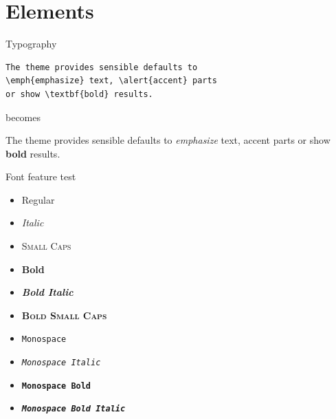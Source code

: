 \section{Elements}

\begin{frame}[fragile]{Typography}
            \begin{verbatim}The theme provides sensible defaults to
\emph{emphasize} text, \alert{accent} parts
or show \textbf{bold} results.\end{verbatim}

    \begin{center}becomes\end{center}

    The theme provides sensible defaults to \emph{emphasize} text,
    \alert{accent} parts or show \textbf{bold} results.
\end{frame}

\begin{frame}{Font feature test}
    \begin{itemize}
        \item Regular
        \item \textit{Italic}
        \item \textsc{Small Caps}
        \item \textbf{Bold}
        \item \textbf{\textit{Bold Italic}}
        \item \textbf{\textsc{Bold Small Caps}}
        \item \texttt{Monospace}
        \item \texttt{\textit{Monospace Italic}}
        \item \texttt{\textbf{Monospace Bold}}
        \item \texttt{\textbf{\textit{Monospace Bold Italic}}}
    \end{itemize}
\end{frame}

